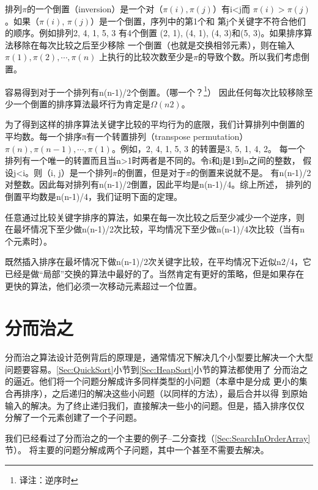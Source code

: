 排列$\pi$的一个倒置（inversion）是一个对（$\pi(i), \pi(j)$）有i<j而
$\pi(i)>\pi(j)$。如果（$\pi(i)$, $\pi(j)$）是一个倒置，序列中的第1个和
第j个关键字不符合他们的顺序。例如排列2, 4, 1, 5, 3 有4个倒置
(2, 1),  (4, 1),  (4, 3)和(5, 3)。如果排序算法移除在每次比较之后至少移除
一个倒置（也就是交换相邻元素），则在输入$\pi(1), π(2), \cdots, \pi(n)$
上执行的比较次数至少是$\pi$的导致个数。所以我们考虑倒置。

容易得到对于一个排列有n(n-1)/2个倒置。（哪一个？\footnote{译注：逆序时}）
因此任何每次比较移除至少一个倒置的排序算法最坏行为肯定是$\Omega(n2)$。

为了得到这样的排序算法关键字比较的平均行为的底限，我们计算排列中倒置的
平均数。每一个排序π有一个转置排列（transpose permutation）
$\pi(n), \pi(n-1), \cdots, \pi(1)$。例如，2, 4, 1, 5, 3 的转置是3, 5, 1, 4, 2。
每一个排列有一个唯一的转置而且当n>1时两者是不同的。令i和j是1到n之间的整数，
假设j<i。则（i, j）是一个排列$\pi$的倒置，但是对于$\pi$的倒置来说就不是。
有n(n-1)/2对整数。因此每对排列有n(n-1)/2倒置，因此平均是n(n-1)/4。综上所述，
排列的倒置平均数是n(n-1)/4，我们证明下面的定理。

\begin{theorem}\label{Theorem:4_1}
任意通过比较关键字排序的算法，如果在每一次比较之后至少减少一个逆序，则
在最坏情况下至少做n(n-1)/2次比较，平均情况下至少做n(n-1)/4次比较（当有n个元素时）。
\end{theorem}

既然插入排序在最坏情况下做n(n-1)/2次关键字比较，在平均情况下近似n2/4，它
已经是做“局部”交换的算法中最好的了。当然肯定有更好的策略，但是如果存在
更快的算法，他们必须一次移动元素超过一个位置。

\section{分而治之}\label{Sec:DividAndConquer}
分而治之算法设计范例背后的原理是，通常情况下解决几个小型要比解决一个大型
问题要容易。\ref{Sec:QuickSort}小节到\ref{Sec:HeapSort}小节的算法都使用了
分而治之的逼近。他们将一个问题分解成许多同样类型的小问题（本章中是分成
更小的集合再排序），之后递归的解决这些小问题（以同样的方法），最后合并以得
到原始输入的解决。为了终止递归我们，直接解决一些小的问题。但是，插入排序仅仅
分解了一个元素创建了一个子问题。

我们已经看过了分而治之的一个主要的例子--二分查找（\ref{Sec:SearchInOrderArray}节）。
将主要的问题分解成两个子问题，其中一个甚至不需要去解决。

